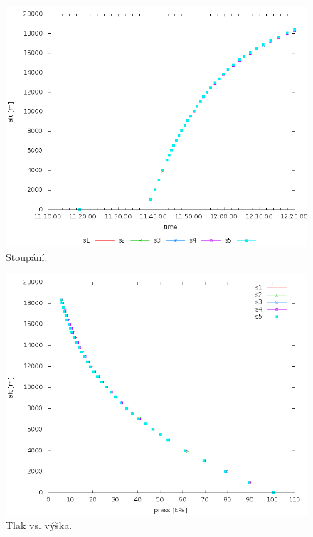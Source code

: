 \documentclass[12pt,a4paper,oneside]{article}
\begin{document}
\begin{figure} [htbp]
\centering
\includegraphics [width=130mm, origin=c] {./img/Stoupani.png}
\caption{Stoupání.}
\label{stoupani}
\end{figure}

\begin{figure} [htbp]
\centering
\includegraphics [width=130mm, origin=c] {./img/Tlak_vyska.png}
\caption{Tlak vs. výška.}
\label{tlak_vyska}
\end{figure}
\end{document}
